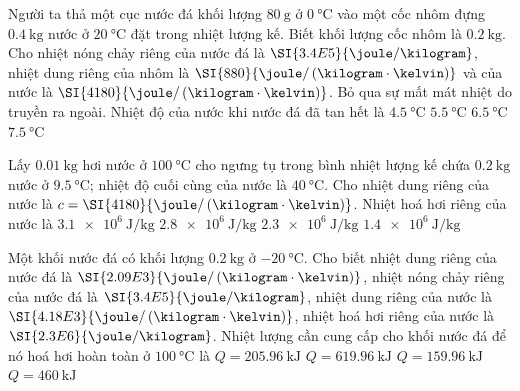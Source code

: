 \begin{ex}
Người ta thả một cục nước đá khối lượng $\SI{80}{\gram}$ ở $\SI{0}{\celsius}$ vào một cốc nhôm đựng $\SI{0.4}{\kilogram}$ nước ở $\SI{20}{\celsius}$ đặt trong nhiệt lượng kế. Biết khối lượng cốc nhôm là $\SI{0.2}{\kilogram}$. Cho nhiệt nóng chảy riêng của nước đá là $\SI{3.4E5}{\joule/\kilogram}$, nhiệt dung riêng của nhôm là $\SI{880}{\joule/\left(\kilogram\cdot\kelvin\right)}$ và của nước là $\SI{4180}{\joule/\left(\kilogram\cdot\kelvin\right)}$. Bỏ qua sự mất mát nhiệt do truyền ra ngoài. Nhiệt độ của nước khi nước đá đã tan hết là
	\choice
	{\True $\SI{4.5}{\celsius}$}
	{$\SI{5.5}{\celsius}$}
	{$\SI{6.5}{\celsius}$}
	{$\SI{7.5}{\celsius}$}
\end{ex}
\begin{ex}
	Lấy $\SI{0.01}{\kilogram}$ hơi nước ở $\SI{100}{\celsius}$ cho ngưng tụ trong bình nhiệt lượng kế chứa $\SI{0.2}{\kilogram}$ nước ở $\SI{9.5}{\celsius}$; nhiệt độ cuối cùng của nước là $\SI{40}{\celsius}$. Cho nhiệt dung riêng của nước là $c=\SI{4180}{\joule/\left(\kilogram\cdot\kelvin\right)}$. Nhiệt hoá hơi riêng của nước là
	\choice
	{$\SI{3.1e6}{\joule/\kilogram}$}
	{$\SI{2.8e6}{\joule/\kilogram}$}
	{\True $\SI{2.3e6}{\joule/\kilogram}$}
	{$\SI{1.4e6}{\joule/\kilogram}$}
\end{ex}
\begin{ex}
	Một khối nước đá có khối lượng $\SI{0.2}{\kilogram}$ ở $\SI{-20}{\celsius}$. Cho biết nhiệt dung riêng của nước đá là $\SI{2.09E3}{\joule/\left(\kilogram\cdot\kelvin\right)}$, nhiệt nóng chảy riêng của nước đá là $\SI{3.4E5}{\joule/\kilogram}$, nhiệt dung riêng của nước là $\SI{4.18E3}{\joule/\left(\kilogram\cdot\kelvin\right)}$, nhiệt hoá hơi riêng của nước là $\SI{2.3E6}{\joule/\kilogram}$. Nhiệt lượng cần cung cấp cho khối nước đá để nó hoá hơi hoàn toàn ở $\SI{100}{\celsius}$ là
	\choice
	{$Q=\SI{205.96}{\kilo\joule}$}
	{\True $Q=\SI{619.96}{\kilo\joule}$}
	{$Q=\SI{159.96}{\kilo\joule}$}
	{$Q=\SI{460}{\kilo\joule}$}
\end{ex}
